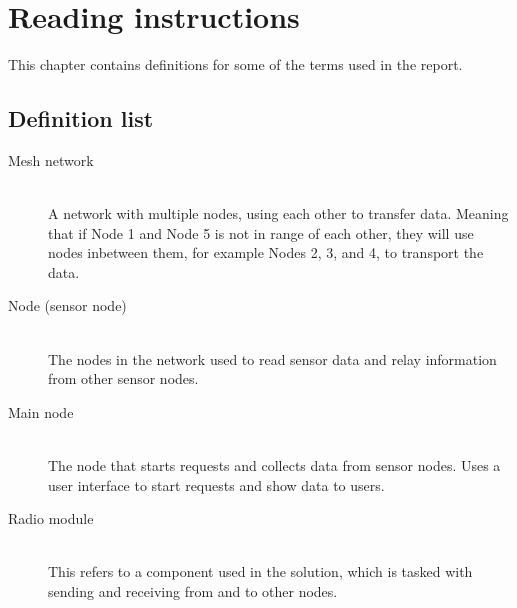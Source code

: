 \chapter{Reading instructions}

This chapter contains definitions for some of the terms used in the report.

\section*{Definition list}

\begin{description}
\item[Mesh network] \hfill \\
A network with multiple nodes, using each other to transfer data. Meaning that if Node 1 and Node 5 is not in range of each other, they will use nodes inbetween them, for example Nodes 2, 3, and 4, to transport the data.
\item[Node (sensor node)] \hfill \\
The nodes in the network used to read sensor data and relay information from other sensor nodes.
\item[Main node] \hfill \\
The node that starts requests and collects data from sensor nodes. Uses a user interface to start requests and show data to users.
\item[Radio module] \hfill \\
This refers to a component used in the solution, which is tasked with sending and receiving from and to other nodes.
\end{description}
